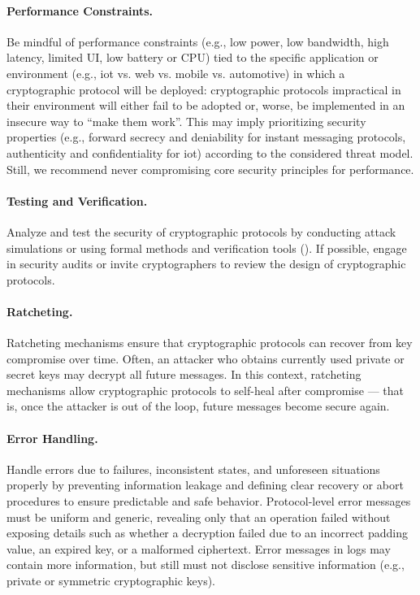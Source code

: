 \paragraph*{Performance Constraints.} Be mindful of performance constraints (e.g., low power, low bandwidth, high latency, limited UI, low battery or CPU) tied to the specific application or environment (e.g., \gls{iot} vs. web vs. mobile vs. automotive) in which a cryptographic protocol will be deployed: cryptographic protocols impractical in their environment will either fail to be adopted or, worse, be implemented in an insecure way to ``make them work''. This may imply prioritizing security properties (e.g., forward secrecy and deniability for instant messaging protocols, authenticity and confidentiality for \gls{iot}) according to the considered threat model. Still, we recommend never compromising core security principles for performance.

\paragraph*{Testing and Verification.} Analyze and test the security of cryptographic protocols by conducting attack simulations or using formal methods and verification tools (). If possible, engage in security audits or invite cryptographers to review the design of cryptographic protocols.

\paragraph*{Ratcheting.} Ratcheting mechanisms
ensure that cryptographic protocols can recover from key compromise over time. Often, an attacker who obtains currently used private or secret keys may decrypt all future messages. In this context, ratcheting mechanisms allow cryptographic protocols to self-heal after compromise --- that is, once the attacker is out of the loop, future messages become secure again.

\paragraph*{Error Handling.} Handle errors due to failures, inconsistent states, and unforeseen situations properly by preventing information leakage and defining clear recovery or abort procedures to ensure predictable and safe behavior. Protocol-level error messages must be uniform and generic, revealing only that an operation failed without exposing details such as whether a decryption failed due to an incorrect padding value, an expired key, or a malformed ciphertext. Error messages in logs may contain more information, but still must not disclose sensitive information (e.g., private or symmetric cryptographic keys).

